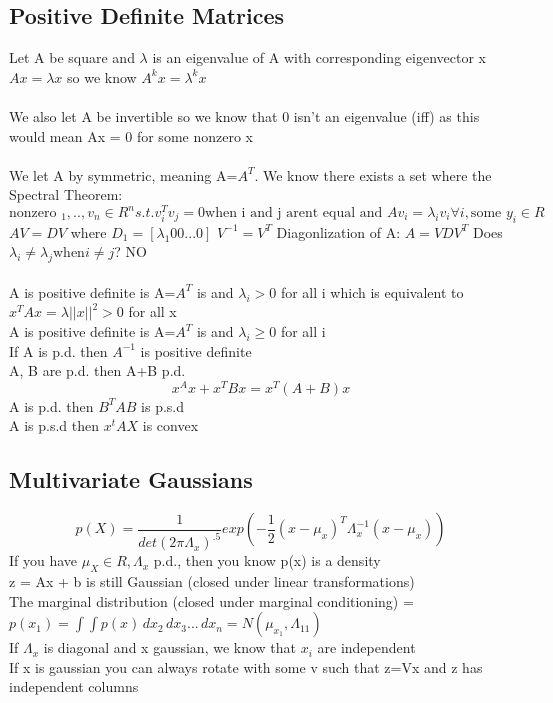 \documentclass{article}
\begin{document}
\subsection{Positive Definite Matrices}
Let A be square and $\lambda$ is an eigenvalue of A with corresponding eigenvector x $Ax = \lambda x$ so we know $A^k x = \lambda^k x$ \\ \\
We also let A be invertible so we know that 0 isn't an eigenvalue (iff)
as this would mean Ax = 0 for some nonzero x \\ \\
We let A by symmetric, meaning A=$A^T$. We know there exists a set where the Spectral Theorem:
$$\textrm{nonzero }_1,..,v_n \in R^n s.t. v_i^Tv_j = 0 \textrm{when i and j arent equal and } Av_i = \lambda_i v_i \forall i, \textrm{some } y_i \in R$$
$AV = DV$ where $D_1 = [\lambda_1 0 0 ... 0]$
$V^{-1} = V^T$
Diagonlization of A: $A = VDV^T$
Does $\lambda_i \neq \lambda_j \textrm{when} i \neq j$? NO \\ \\
A is positive definite is A=$A^T$ is and $\lambda_i > 0$ for all i which is equivalent to $x^TAx = \lambda ||x||^2 > 0$ for all x \\
A is positive definite is A=$A^T$ is and $\lambda_i \geq 0$ for all i \\
If A is p.d. then $A^{-1}$ is positive definite \\
A, B are p.d. then A+B p.d. \\ 
$$x^Ax + x^TBx = x^T(A+B)x$$
A is p.d. then $B^TAB$ is p.s.d \\
A is p.s.d then $x^tAX$ is convex

\subsection{Multivariate Gaussians}
$$p(X) = \frac{1}{det(2\pi \Lambda_x)^{.5}} exp(-\frac{1}{2}(x-\mu_x)^T \Lambda_x^{-1} (x-\mu_x))$$
If you have $\mu_X \in R, \Lambda_x$ p.d., then you know p(x) is a density\\
z = Ax + b is still Gaussian (closed under linear transformations) \\
The marginal distribution (closed under marginal conditioning) = $p(x_1) = \int \int p(x) \, dx_2 \, dx_3 ... \, dx_n = N(\mu_{x_1}, \Lambda_{11})$ \\
If $\Lambda_x$ is diagonal and x gaussian, we know that $x_i$ are independent\\
If x is gaussian you can always rotate with some v such that z=Vx and z has independent columns
\end{document}

